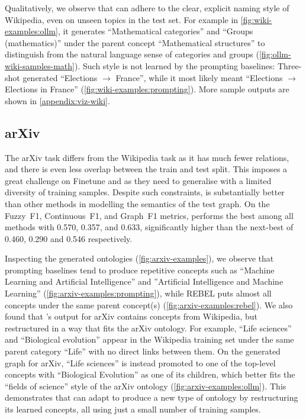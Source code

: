 

Qualitatively, we observe that \name can adhere to the clear, explicit naming style of Wikipedia, even on unseen topics in the test set. For example in \cref{fig:wiki-examples:ollm}, it generates ``Mathematical categories'' and ``Groups (mathematics)'' under the parent concept ``Mathematical structures'' to distinguish from the natural language sense of categories and groups (\cref{fig:ollm-wiki-samples-math}). Such style is not learned by the prompting baselines: Three-shot generated ``Elections $\to$ France'', while it most likely meant ``Elections $\to$ Elections in France'' (\cref{fig:wiki-examples:prompting}). More sample outputs are shown in \cref{appendix:viz-wiki}.

\subsection{arXiv}

The arXiv task differs from the Wikipedia task as it has much fewer relations, and there is even less overlap between the train and test split. This imposes a great challenge on Finetune and \name as they need to generalise with a limited diversity of training samples. Despite such constraints, \name is substantially better than other methods in modelling the semantics of the test graph.
On the Fuzzy~F1, Continuous~F1, and Graph~F1 metrics, \name performs the best among all methods with 0.570, 0.357, and 0.633, significantly higher than the next-best of 0.460, 0.290 and 0.546 respectively.



Inspecting the generated ontologies (\cref{fig:arxiv-examples}), we observe that prompting baselines tend to produce repetitive concepts such as ``Machine Learning and Artificial Intelligence'' and ''Artificial Intelligence and Machine Learning'' (\cref{fig:arxiv-examples:prompting}), while REBEL puts almost all concepts under the same parent concept(s) (\cref{fig:arxiv-examples:rebel}).
We also found that \name's output for arXiv contains concepts from Wikipedia, but restructured in a way that fits the arXiv ontology. For example, ``Life sciences'' and ``Biological evolution'' appear in the Wikipedia training set under the same parent category ``Life'' with no direct links between them. On the generated graph for arXiv, ``Life sciences'' is instead promoted to one of the top-level concepts with ``Biological Evolution'' as one of its children, which better fits the ``fields of science'' style of the arXiv ontology (\cref{fig:arxiv-examples:ollm}). This demonstrates that \name can adapt to produce a new type of ontology by restructuring its learned concepts, all using just a small number of training samples.

